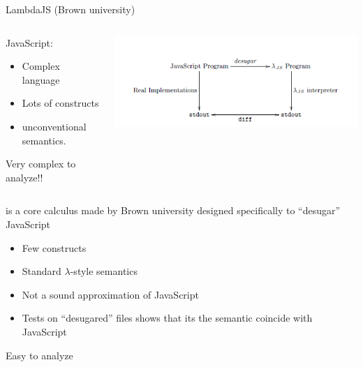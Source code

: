 \documentclass[11pt]{beamer}
\begin{document}
\begin{frame}{LambdaJS (Brown university\cite{LambdaJS})}
\begin{columns}[T]
\begin{column}{.48\textwidth}
JavaScript:
\begin{itemize}
\item Complex language
\item Lots of constructs
\item unconventional semantics.
\end{itemize}
Very complex to analyze!!
\end{column}
\begin{column}{.50\textwidth}
\includegraphics[scale=0.42]{Images/LambdaJS.PNG}
\end{column}
\end{columns}\vspace{0.5cm}

\ljs\cite{LambdaJS} is a core calculus made by Brown university designed specifically to ``desugar'' JavaScript
\begin{itemize}
\item Few constructs
\item Standard $\lambda$-style semantics
\item Not a sound approximation of JavaScript
\item Tests on ``desugared'' files shows that its the semantic coincide with JavaScript
\end{itemize}
Easy to analyze
\end{frame}
\end{document}
